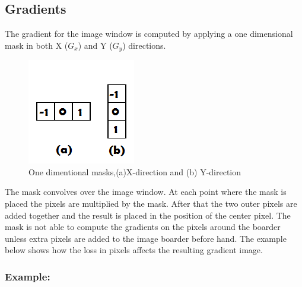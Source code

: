 \subsection{Gradients}
The gradient for the image window is computed by applying a one dimensional mask in both X ($G_x$) and Y ($G_y$) directions.\

\begin{figure}[H]
  \centering
  \includegraphics[scale=0.8]{sobel}
  \caption{One dimentional masks,(a)X-direction and (b) Y-direction}
\end{figure}
\begin{flushleft}
The mask convolves over the image window. At each point where the mask is placed the pixels are multiplied by the mask. After that the two outer pixels are added together and the result is placed in the position of the center pixel. The mask is not able to compute the gradients on the pixels around the boarder unless extra pixels are added to the image boarder before hand. The example below shows how the loss in pixels affects the resulting gradient image.
\end{flushleft}
\subsubsection{Example:}

